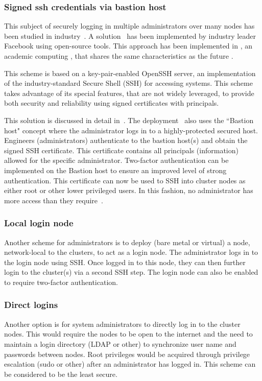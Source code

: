 \documentclass[12pt,a4paper]{article}
\begin{document}
\subsubsection{Signed ssh credentials via bastion host} \label{ssec:bastion}

This subject of securely logging in multiple administrators over many nodes has been studied in industry~\cite{secure-ssh}.
A solution~\cite{fb-ssh} has been implemented by industry leader Facebook using open-source tools.
This approach has been implemented in \nnt, an academic computing \einfra, that shares the same characteristics as the future \ED \einfra.

This scheme is based on a key-pair-enabled OpenSSH server, an implementation of the industry-standard Secure Shell (SSH) for accessing systems.
This scheme takes advantage of its special features, that are not widely leveraged, to provide both security and reliability using signed certificates with principals.

This solution is discussed in detail in~\cite{fb-ssh}.
The \nnt deployment~\cite{nt1-ssh} also uses the ``Bastion host" concept where the administrator logs in to a highly-protected secured host.
Engineers (administrators) authenticate to the bastion host(s) and obtain the signed SSH certificate.
This certificate contains all principals (information) allowed for the specific administrator. 
Two-factor authentication can be implemented on the Bastion host to ensure an improved level of strong authentication.
This certificate can now be used to SSH into cluster nodes as either root or other lower privileged users.
In this fashion, no administrator has more access than they require~\cite{privileges}.

\subsubsection{Local login node}
\label{ssec:local-login-node}

Another scheme for administrators is to deploy (bare metal or virtual) a node, network-local to the \ED clusters, to act as a login node.
The administrator logs in to the login node using SSH.
Once logged in to this node, they can then further login to the cluster(s) via a second SSH step.
The login node can also be enabled to require two-factor authentication.

\subsubsection{Direct logins}
\label{ssec:direct}
Another option is for system administrators to directly log in to the cluster nodes.
This would require the nodes to be open to the internet and the need to maintain a login directory (LDAP or other) to synchronize user name and passwords between nodes.
Root privileges would be acquired through privilege escalation (sudo or other) after an administrator has logged in.
This scheme can be considered to be the least secure.
\end{document}
